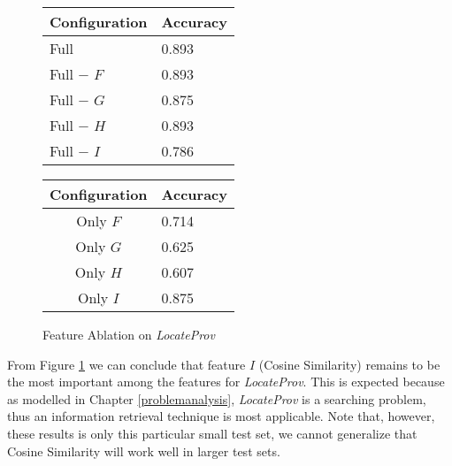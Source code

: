 \begin{figure}[ht]
\begin{minipage}[b]{0.45\linewidth}\centering
\begin{tabular}{ l | l }
Configuration & Accuracy \\
\hline
Full			& 0.893 \\
Full $-$ $F$	& 0.893 \\
Full $-$ $G$	& 0.875 \\
Full $-$ $H$	& 0.893 \\
Full $-$ $I$	& 0.786 \\
\end{tabular}
\end{minipage}
\hspace{0.5cm}
\begin{minipage}[b]{0.45\linewidth}\centering
\begin{tabular}{ c | l }
Configuration & Accuracy \\
\hline
Only $F$	& 0.714 \\
Only $G$	& 0.625 \\
Only $H$	& 0.607 \\
Only $I$	& 0.875 \\
\end{tabular}
\end{minipage}
\caption{Feature Ablation on {\it LocateProv}}
\label{fig:ablation_second}
\end{figure}
From Figure \ref{fig:ablation_second} we can conclude that feature $I$ (Cosine Similarity) remains to be the most important among the features for {\it LocateProv}. This is expected because as modelled in Chapter \ref{problemanalysis}, {\it LocateProv} is a searching problem, thus an information retrieval technique is most applicable. 
Note that, however, these results is only this particular small test set, we cannot generalize that Cosine Similarity will work well in larger test sets.

